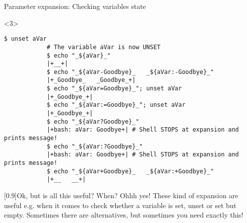 \begin{frame}[fragile]{Parameter expansion: Checking variables state}
    \begin{onlyenv}<3>
        \begin{lstlisting}[style=MyBash, style=oddnumbers, style=smaller, firstnumber=26]
            $ unset aVar
            # The variable aVar is now UNSET
            $ echo "_${aVar}_"
            |+__+|
            $ echo "_${aVar-Goodbye}_   _${aVar:-Goodbye}_"
            |+_Goodbye_   _Goodbye_+|
            $ echo "_${aVar=Goodbye}_"; unset aVar
            |+_Goodbye_+|
            $ echo "_${aVar:=Goodbye}_"; unset aVar
            |+_Goodbye_+|
            $ echo "_${aVar?Goodbye}_"
            |+bash: aVar: Goodbye+| # Shell STOPS at expansion and prints message!
            $ echo "_${aVar:?Goodbye}_"
            |+bash: aVar: Goodbye+| # Shell STOPS at expansion and prints message!
            $ echo "_${aVar+Goodbye}_   _${aVar:+Goodbye}_"
            |+__   __+|
        \end{lstlisting}
        \begin{varblock}{}[0.9\textwidth]{Ok, but is all this useful? When?}
            Ohhh yes! These kind of expansion are useful e.g. when it comes to check whether a variable is set, unset or set but empty.
            Sometimes there are alternatives, but sometimes you need exactly this!
        \end{varblock}
    \end{onlyenv}
\end{frame}
